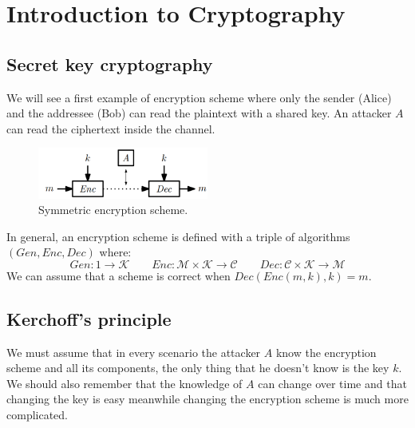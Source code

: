 \documentclass[../main]{subfiles}
\begin{document}
\chapter{Introduction to Cryptography}

\section{Secret key cryptography}
We will see a first example of encryption scheme where only the sender (Alice) and the addressee (Bob) can read the plaintext with a shared key. An attacker $A$ can read the ciphertext inside the channel.
\begin{figure}[h]
    \centering
    \includegraphics[width=0.5\textwidth]{images/secret_key_cryptography.png}
    \caption{Symmetric encryption scheme.}
\end{figure}
\newline
In general, an encryption scheme is defined with a triple of algorithms $(Gen, Enc, Dec)$ where:
$$Gen: 1 \rightarrow{} \mathcal{K} \quad\quad Enc: \mathcal{M} \times \mathcal{K} \rightarrow{} \mathcal{C} \quad\quad Dec: \mathcal{C} \times \mathcal{K} \rightarrow{} \mathcal{M}$$
We can assume that a scheme is correct when $Dec(Enc(m, k), k) = m$.
\section{Kerchoff’s principle}
We must assume that in every scenario the attacker $A$ know the encryption scheme and all its components, the only thing that he doesn't know is the key $k$.
We should also remember that the knowledge of $A$ can change over time and that changing the key is easy meanwhile changing the encryption scheme is much more complicated.
\end{document}
